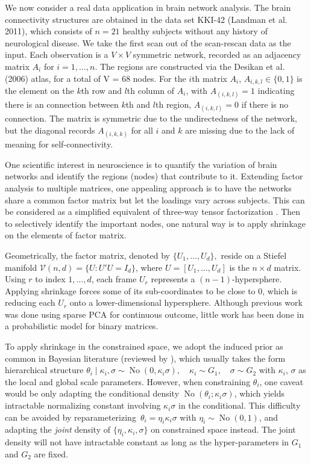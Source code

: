 \documentclass[10pt,fleqn]{article}
\newcommand{\mc}[1]{\mathcal{#1}}
\DeclareMathOperator{\No}{No}
\DeclareMathOperator{\1}{\mathbbm{1}}
\begin{document}
 We now consider a real data application in brain network analysis. 
 The brain connectivity structures are obtained in the data set KKI-42 (Landman et al. 2011), which consists of $n=21$ healthy subjects without any history of neurological disease. We take the first scan out of the scan-rescan data
as the input. Each observation is a $V\times V$ symmetric network, recorded as an adjacency matrix $A_i$ for $i=1,\ldots,n$. The regions are constructed via the Desikan et al. (2006) atlas, for a total of V = 68 nodes.
For the $i$th matrix $A_i$, $A_{i,k,l} \in \{0,1\}$ is the element on the $k$th row and $l$th column of $A_i$, with $A_{(i,k,l)}=1$ indicating there is an connection between $k$th and $l$th region, $A_{(i,k,l)}=0$ if there is no connection. The matrix is symmetric due to the undirectedness of the network,
but the diagonal records $A_{(i,k,k)}$ for all $i$ and $k$ are missing due
to the lack of meaning for self-connectivity. 


One scientific interest in neuroscience is to quantify the variation of brain networks and identify the  regions
(nodes) that contribute to it. Extending 
factor analysis to multiple matrices, one appealing approach
is to have the networks share a common factor matrix but let the  loadings
vary across subjects. This
can be considered as a simplified equivalent of three-way
tensor factorization \citep{kolda2009tensor}. Then to selectively identify the important nodes, one natural way is to apply shrinkage on the elements
of factor matrix.


Geometrically, the factor matrix, denoted by $\{U_1,\ldots,U_d\},$ reside on a Stiefel manifold $\mc V(n,d)=\{U: U'U=I_d\}$, where $U=[U_1,\ldots,U_d]$ is the $n\times d$ matrix. Using $r$ to index $1,\ldots,d$, each frame $U_r$ represents a $(n-1)$-hypersphere. Applying shrinkage forces some of its sub-coordinates to be close to $0$, which
is  reducing each $U_r$ onto a lower-dimensional hypersphere.
Although previous work was done using sparse PCA \citep{zou2006sparse} for
continuous outcome,  little work has been done in a probabilistic model for
binary matrices.

To apply shrinkage in the constrained space, we adopt the induced prior  as common in Bayesian  literature (reviewed by
\cite{polson2012local}), which usually takes the form hierarchical structure $\theta_i\mid
\kappa_i  ,\sigma\sim \No(0,\kappa_i \sigma), \quad \kappa_i\sim G_1, \quad \sigma \sim G_2$ with
$\kappa_i$, $\sigma$ as the local and global scale parameters.  However,
when constraining $\theta_i$, one caveat would be only adapting the conditional density $\No(\theta_i;\kappa_i \sigma)$, which  yields intractable normalizing constant involving $\kappa_i \sigma$ in the conditional. This difficulty can be avoided by
reparameterizing\ $\theta_i=\eta_i\kappa_i\sigma$ with $\eta_i\sim\No(0,1)$, and adapting the {\it joint} density of $\{\eta_i,\kappa_i,\sigma\}$ on constrained
space instead. The
joint density will not have intractable constant as long as the hyper-parameters in $G_1$ and $G_2$ are fixed.
\end{document}
